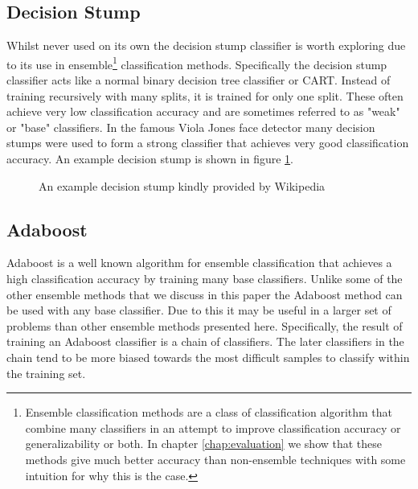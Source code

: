 \documentclass[ %
                    author={Sam Phippen},
                supervisor={Dr. Rafal Bogacz},
                     title={Real time voice activity detectors in noisy personal computing environments},
                  subtitle={},
                    degree={MEng},
                      year={2012} ]{thesis}
\begin{document}
\subsection{Decision Stump}

Whilst never used on its own the decision stump classifier is worth exploring
due to its use in ensemble\footnote{Ensemble classification methods are a class
    of classification algorithm that combine many classifiers in an attempt to
    improve classification accuracy or generalizability or both. In chapter
\ref{chap:evaluation} we show that these methods give much better accuracy than
non-ensemble techniques with some intuition for why this is the case.}
classification methods. Specifically the decision stump classifier acts like a
normal binary decision tree classifier or CART. Instead of training recursively
with many splits, it is trained for only one split. These often achieve very
low classification accuracy and are sometimes referred to as "weak" or "base"
classifiers. In the famous Viola Jones face detector\cite{viola} many decision
stumps were used to form a strong classifier that achieves very good
classification accuracy. An example decision stump is shown in figure
\ref{fig:decision-stump}.

\begin{figure}



    \caption{An example decision stump kindly provided by Wikipedia}
    \label{fig:decision-stump}
\end{figure}

\subsection{Adaboost}

Adaboost is a well known algorithm for ensemble classification that achieves a
high classification accuracy by training many base classifiers. Unlike some of
the other ensemble methods that we discuss in this paper the Adaboost method
can be used with any base classifier. Due to this it may be useful in a larger
set of problems than other ensemble methods presented here. Specifically, the
result of training an Adaboost classifier is a chain of classifiers. The later
classifiers in the chain tend to be more biased towards the most difficult
samples to classify within the training set.
\end{document}
